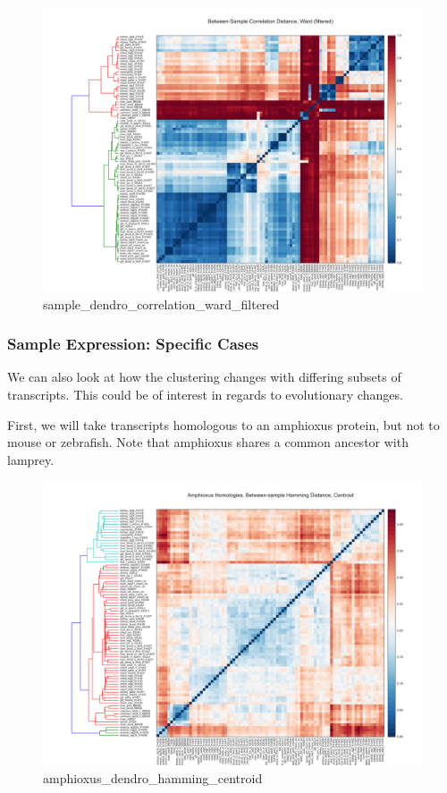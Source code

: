 \documentclass{article}
\begin{document}
\begin{figure}[htbp]
\centering
\includegraphics{sample_dendro_correlation_ward_filtered.svg}
\caption{sample\_dendro\_correlation\_ward\_filtered}
\end{figure}


    \subsubsection{Sample Expression: Specific Cases}


    We can also look at how the clustering changes with differing subsets of
transcripts. This could be of interest in regards to evolutionary
changes.

First, we will take transcripts homologous to an amphioxus protein, but
not to mouse or zebrafish. Note that amphioxus shares a common ancestor
with lamprey.

\begin{figure}[htbp]
\centering
\includegraphics{amphioxus_dendro_hamming_centroid.svg}
\caption{amphioxus\_dendro\_hamming\_centroid}
\end{figure}
\end{document}

